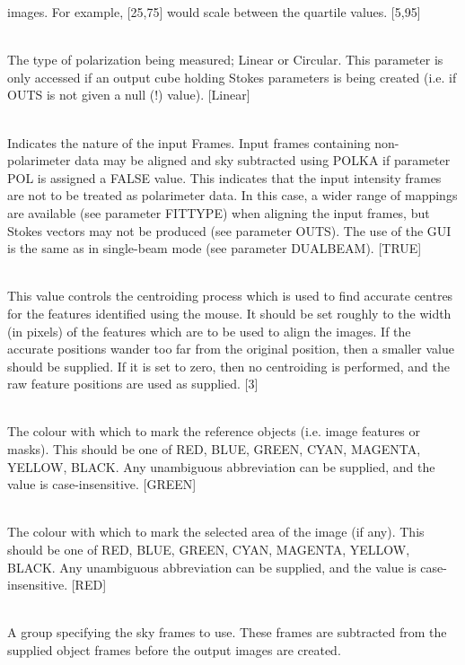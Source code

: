 \documentclass[twoside,11pt]{article}
\renewcommand{\_}{\texttt{\symbol{95}}}
\newcommand{\sstsubsection}[1]{ \item[{#1}] \mbox{} \\}
\newcommand{\sstsubsection}[1]{\item[{#1}]}
\begin{document}
{{{         images. For example, [25,75] would scale between the quartile
         values. [5,95]
      }
      \sstsubsection{
         PMODE = LITERAL (Read)
      }{
         The type of polarization being measured; Linear or Circular. This
         parameter is only accessed if an output cube holding Stokes
         parameters is being created (i.e. if OUT\_S is not given a null (!)
         value). [Linear]
      }
      \sstsubsection{
         POL = \_LOGICAL (Read)
      }{
         Indicates the nature of the input Frames. Input frames containing
         non-polarimeter data may be aligned and sky subtracted using POLKA
         if parameter POL is assigned a FALSE value. This indicates that the
         input intensity frames are not to be treated as polarimeter data. In
         this case, a wider range of mappings are available (see parameter
         FITTYPE) when aligning the input frames, but Stokes vectors may not
         be produced (see parameter OUT\_S). The use of the GUI is the same as
         in single-beam mode (see parameter DUALBEAM). [TRUE]
      }
      \sstsubsection{
         PSFSIZE = \_INTEGER (Update)
      }{
         This value controls the centroiding process which is used to find
         accurate centres for the features identified using the mouse.
         It should be set roughly to the width (in pixels) of the
         features which are to be used to align the images. If the
         accurate positions wander too far from the original position, then
         a smaller value should be supplied. If it is set to zero, then
         no centroiding is performed, and the raw feature positions are
         used as supplied. [3]
      }
      \sstsubsection{
         REFCOL = LITERAL (Update)
      }{
         The colour with which to mark the reference objects (i.e. image
         features or masks). This should be one of RED, BLUE, GREEN, CYAN,
         MAGENTA, YELLOW, BLACK. Any unambiguous abbreviation can be supplied,
         and the value is case-insensitive. [GREEN]
      }
      \sstsubsection{
         SELCOL = LITERAL (Update)
      }{
         The colour with which to mark the selected area of the image (if any).
         This should be one of RED, BLUE, GREEN, CYAN, MAGENTA, YELLOW, BLACK.
         Any unambiguous abbreviation can be supplied, and the value is
         case-insensitive. [RED]
      }
      \sstsubsection{
         SKYFRAMES = NDF (Read)
      }{
         A group specifying the sky frames to use. These frames are subtracted
         from the supplied object frames before the output images are created.
}}}
\end{document}
